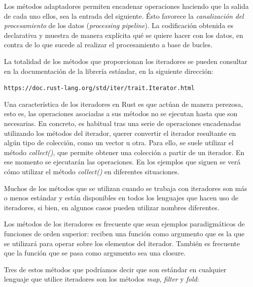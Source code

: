 Los métodos adaptadores permiten encadenar operaciones haciendo que la salida de cada uno ellos, sea la entrada del siguiente. Ésto favorece la \textit{canalización del procesamiento} de los datos (\textit{processing pipeline}). La codificación obtenida es declarativa y muestra de manera explícita qué se quiere hacer con los datos, en contra de lo que sucede al realizar el procesamiento a base de bucles.

La totalidad de los métodos que proporcionan los iteradores se pueden consultar en la documentación de la librería estándar, en la siguiente dirección:

{\centering\small \texttt{https://doc.rust-lang.org/std/iter/trait.Iterator.html} \par}

Una característica de los iteradores en Rust es que actúan de manera perezosa, esto es, las operaciones asociadas a sus métodos no se ejecutan hasta que son necesarias. En concreto, es habitual tras una serie de operaciones encadenadas utilizando los métodos del iterador, querer convertir el iterador resultante en algún tipo de colección, como un vector u otra. Para ello, se suele utilizar el método \textit{collect()}, que permite obtener una colección a partir de un iterador. En ese momento se ejecutarán las operaciones. En los ejemplos que siguen se verá cómo utilizar el método \textit{collect()} en diferentes situaciones.

Muchos de los métodos que se utilizan cuando se trabaja con iteradores son más o menos estándar y están disponibles en todos los lenguajes que hacen uso de iteradores, si bien, en algunos casos pueden utilizar nombres diferentes. 

Los métodos de los iteradores es frecuente que sean ejemplos paradigmáticos de funciones de orden superior: reciben una función como argumento que es la que se utilizará para operar sobre los elementos del iterador. También es frecuente que la función que se pasa como argumento sea una closure.

Tres de estos métodos que podríamos decir que son estándar en cualquier lenguaje que utilice iteradores son los métodos \textit{map}, \textit{filter} y \textit{fold}:

